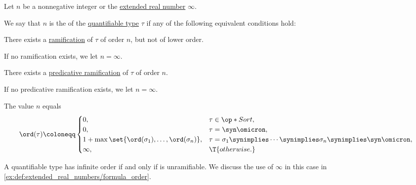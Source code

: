 \begin{definition}\label{def:quantifiable_type_ramification_order}\mimprovised
  Let \( n \) be a nonnegative integer or the \hyperref[def:extended_real_numbers]{extended real number} \( \infty \).

  We say that \( n \) is the  of the \hyperref[def:quantifiable_type]{quantifiable type} \( \tau \) if any of the following equivalent conditions hold:
  \begin{thmenum}
     There exists a \hyperref[def:ramified_theory_of_types/ramified_type]{ramification} of \( \tau \) of order \( n \), but not of lower order.

    If no ramification exists, we let \( n = \infty \).

     There exists a \hyperref[def:ramified_theory_of_types/predicativity]{predicative ramification} of \( \tau \) of order \( n \).

    If no predicative ramification exists, we let \( n = \infty \).

     The value \( n \) equals
    \begin{equation}\label{eq:def:quantifiable_type_ramification_order/direct}
      \ord(\tau) \coloneqq \begin{cases}
        0,                                                      &\tau \in \op*{Sort}, \\
        0,                                                      &\tau = \syn\omicron, \\
        1 + \max\set{ \ord(\sigma_1), \ldots, \ord(\sigma_n) }, &\tau = \sigma_1 \synimplies \cdots \synimplies \sigma_n \synimplies \syn\omicron, \\
        \infty,                                                 &\T{otherwise.}
      \end{cases}
    \end{equation}
  \end{thmenum}
\end{definition}
\begin{comments}
  \item A quantifiable type has infinite order if and only if is unramifiable. We discuss the use of \( \infty \) in this case in \cref{ex:def:extended_real_numbers/formula_order}.
\end{comments}
